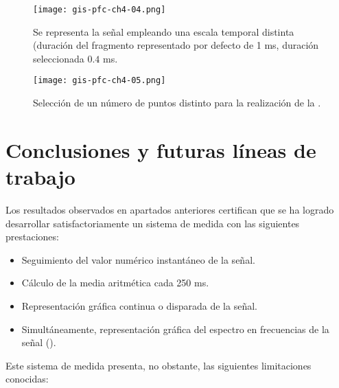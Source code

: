 \begin{figure}[p]
    \begin{center}
	\texttt{[image: gis-pfc-ch4-04.png]}
    \end{center}
    \caption[Selección de otra escala temporal]{Se representa la señal
    empleando una escala temporal distinta (duración del fragmento
    representado por defecto de 1 ms, duración seleccionada $0.4$ ms.}
    \label{fig:scaled}
\end{figure}

\begin{figure}[p]
    \begin{center}
	\texttt{[image: gis-pfc-ch4-05.png]}
    \end{center}
    \caption[Selección de un número de puntos distinto para la realización
    de la ]{Selección de un número de puntos distinto para la
    realización de la .}
    \label{fig:point-number}
\end{figure}


\section{Conclusiones y futuras líneas de trabajo}

Los resultados observados en apartados anteriores certifican que se ha
logrado desarrollar satisfactoriamente un sistema de medida con las
siguientes prestaciones:

\begin{itemize}
    \item Seguimiento del valor numérico instantáneo de la señal.
    \item Cálculo de la media aritmética cada 250 ms.
    \item Representación gráfica continua o disparada de la señal.
    \item Simultáneamente, representación gráfica del espectro en
	frecuencias de la señal ().
\end{itemize}

Este sistema de medida presenta, no obstante, las siguientes limitaciones
conocidas:

